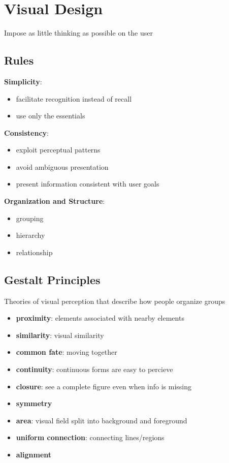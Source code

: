 \documentclass[]{article}
\theoremstyle{definition}
\begin{document}
	\section{Visual Design}
		Impose as little thinking as possible on the user
		\subsection{Rules}
			\textbf{Simplicity}:
			\begin{itemize}
				\item facilitate recognition instead of recall
				\item use only the essentials
			\end{itemize}
			\textbf{Consistency}:
			\begin{itemize}
				\item exploit perceptual patterns
				\item avoid ambiguous presentation
				\item present information consistent with user goals
			\end{itemize}
			\textbf{Organization and Structure}:
			\begin{itemize}
				\item grouping
				\item hierarchy
				\item relationship
			\end{itemize}
		\subsection{Gestalt Principles}
			Theories of visual perception that describe how people organize groups
			\begin{itemize}
				\item \textbf{proximity}: elements associated with nearby elements
				\item \textbf{similarity}: visual similarity
				\item \textbf{common fate}: moving together 
				\item \textbf{continuity}: continuous forms are easy to percieve
				\item \textbf{closure}: see a complete figure even when info is missing
				\item \textbf{symmetry}
				\item \textbf{area}: visual field split into background and foreground
				\item \textbf{uniform connection}: connecting lines/regions 
				\item \textbf{alignment}
			\end{itemize}
	
\end{document}

